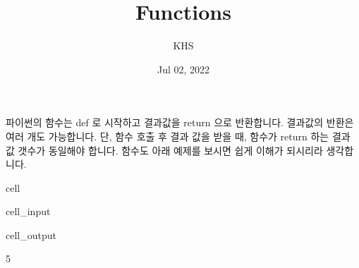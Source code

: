 \documentclass[letterpaper,10pt,english]{jupyterBook}
\title{Functions}
\date{Jul 02, 2022}
\author{KHS}
\begin{document}
\pagestyle{empty}
\sphinxmaketitle
\pagestyle{plain}
\sphinxtableofcontents
\pagestyle{normal}
\label{\detokenize{chapter2/2.1.5_Python_Basics::doc}}


\sphinxAtStartPar
파이썬의 함수는 def 로 시작하고 결과값을 return 으로 반환합니다. 결과값의 반환은 여러 개도 가능합니다. 단, 함수 호출 후 결과 값을 받을 때, 함수가 return 하는 결과 값 갯수가 동일해야 합니다. 함수도 아래 예제를 보시면 쉽게 이해가 되시리라 생각합니다.

\begin{sphinxuseclass}{cell}\begin{sphinxVerbatimInput}

\begin{sphinxuseclass}{cell_input}
\begin{sphinxVerbatim}[commandchars=\\\{\}]
  
        
     

  
\end{sphinxVerbatim}

\end{sphinxuseclass}\end{sphinxVerbatimInput}
\begin{sphinxVerbatimOutput}

\begin{sphinxuseclass}{cell_output}
\begin{sphinxVerbatim}[commandchars=\\\{\}]
5
\end{sphinxVerbatim}

\end{sphinxuseclass}\end{sphinxVerbatimOutput}

\end{sphinxuseclass}
\end{document}
